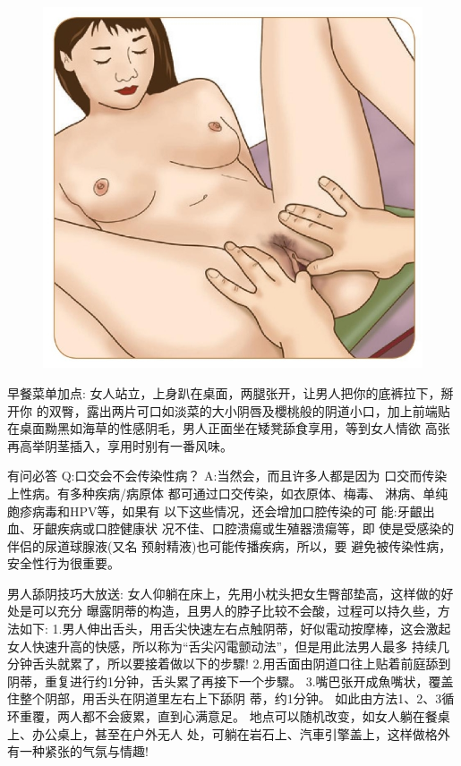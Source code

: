 \documentclass[12pt,UTF8]{ctexbook}
\begin{document}
\begin{figure}[htbp]
	\centering
	\includegraphics[width=0.7\linewidth]{23}
	\caption{}
	\label{fig:1}
\end{figure}

早餐菜单加点:
女人站立，上身趴在桌面，两腿张开，让男人把你的底裤拉下，掰开你
的双臀，露出两片可口如淡菜的大小阴唇及櫻桃般的阴道小口，加上前端贴
在桌面黝黑如海草的性感阴毛，男人正面坐在矮凳舔食享用，等到女人情欲
高张再高举阴茎插入，享用时别有一番风味。

有问必答
Q:口交会不会传染性病？
A:当然会，而且许多人都是因为
口交而传染上性病。有多种疾病/病原体
都可通过口交传染，如衣原体、梅毒、
淋病、单纯皰疹病毒和HPV等，如果有
以下这些情况，还会增加口腔传染的可
能:牙齦出血、牙齦疾病或口腔健康状
况不佳、口腔溃瘍或生殖器溃瘍等，即
使是受感染的伴侣的尿道球腺液(又名
预射精液)也可能传播疾病，所以，要
避免被传染性病，安全性行为很重要。

男人舔阴技巧大放送:
女人仰躺在床上，先用小枕头把女生臀部垫高，这样做的好处是可以充分
曝露阴蒂的构造，且男人的脖子比较不会酸，过程可以持久些，方法如下:
1.男人伸出舌头，用舌尖快速左右点触阴蒂，好似電动按摩棒，这会激起
女人快速升高的快感，所以称为“舌尖闪電颤动法”，但是用此法男人最多
持续几分钟舌头就累了，所以要接着做以下的步驟!
2.用舌面由阴道口往上贴着前庭舔到阴蒂，重复进行约1分钟，舌头累了再接下一个步驟。
3.嘴巴张开成魚嘴状，覆盖住整个阴部，用舌头在阴道里左右上下舔阴
蒂，约1分钟。
如此由方法1、2、3循环重覆，两人都不会疲累，直到心满意足。
地点可以随机改变，如女人躺在餐桌上、办公桌上，甚至在户外无人
处，可躺在岩石上、汽車引擎盖上，这样做格外有一种紧张的气氛与情趣!
\end{document}
